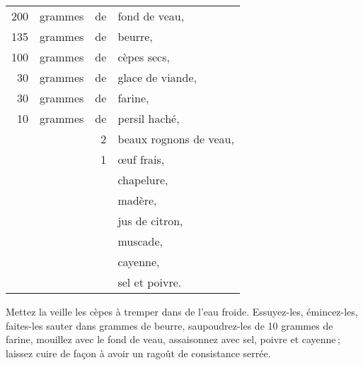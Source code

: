 \footnotesize
\begin{longtable}{rrrp{18em}}
    200 & grammes & de & fond de veau,                                                                   \\
    135 & grammes & de & beurre,                                                                         \\
    100 & grammes & de & cèpes secs,                                                                     \\
     30 & grammes & de & glace de viande,                                                                \\
     30 & grammes & de & farine,                                                                         \\
     10 & grammes & de & persil haché,                                                                   \\
        &         &  2 & beaux rognons de veau,                                                          \\
        &         &  1 & œuf frais,                                                                      \\
        &         &    & chapelure,                                                                      \\
        &         &    & madère,                                                                         \\
        &         &    & jus de citron,                                                                  \\
        &         &    & muscade,                                                                        \\
        &         &    & cayenne,                                                                        \\
        &         &    & sel et poivre.                                                                  \\
\end{longtable}
\normalsize

Mettez la veille les cèpes à tremper dans de l’eau froide. Essuyez-les,
émincez-les, faites-les sauter dans {\mmm} grammes de beurre, saupoudrez-les de 10
grammes de farine, mouillez avec le fond de veau, assaisonnez avec sel, poivre
et cayenne ; laissez cuire de façon à avoir un ragoût de consistance serrée.

